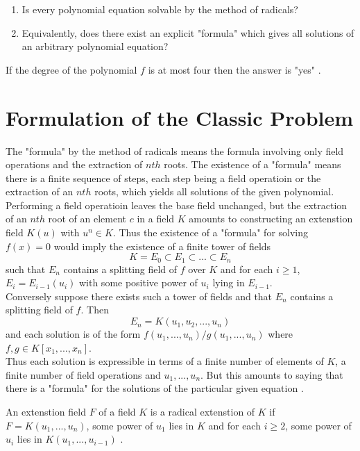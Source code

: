 \begin{enumerate}
\item Is every polynomial equation solvable by the method of radicals?
\item Equivalently, does there exist an explicit "formula" which gives all solutions of an arbitrary polynomial equation?
\end{enumerate}

If the degree of  the polynomial \(f\) is at most four then the answer is "yes" \cite{hunger}.

\section{Formulation of the Classic Problem}
The "formula" by the method of radicals means the formula involving only field operations and the extraction of \(nth\) roots.
The existence of a "formula" means there is a finite sequence of steps, each step being a field operatioin or the extraction of an \(nth\) roots, which yields all solutions of the given polynomial.
Performing a field operatioin leaves the base field unchanged, but the extraction of an \(nth\) root of an element
\(c\) in a field \(K\) amounts to constructing an extenstion field \(K(u)\) with \(u^n \in K\). Thus the existence of a "formula" for solving \(f(x)=0\) would imply
the existence of a finite tower of fields
\[K=E_0 \subset E_1 \subset ... \subset E_n\]
such that \(E_n\) contains a splitting field of \(f\) over \(K\) and for each \(i \geq 1\), \(E_i=E_{i-1}(u_i)\) with some positive power of \(u_i\) lying in \(E_{i-1}\).\\
Conversely suppose there exists such a tower of fields and that \(E_n\) contains a splitting field of \(f\). Then
\[E_n = K(u_1,u_2,...,u_n)\]
and each solution is of the form \(f(u_1,...,u_n)/g(u_1,...,u_n)\) where \(f,g \in K[x_1,...,x_n]\). \\
Thus each solution is expressible in terms of a finite number of elements of \(K\), a finite number of field operations and \(u_1,...,u_n\). But
this amounts to saying that there is a "formula" for the solutions of the particular given equation \cite{hunger}. \\

\begin{definition}
An extenstion field \(F\) of a field \(K\) is a radical extenstion of \(K\) if \(F=K(u_1,...,u_n)\), some power of \(u_1\) lies in \(K\) and for each \(i \geq 2\), some power of \(u_i\) lies in \(K(u_1,...,u_{i-1})\) \cite{hunger}.
\end{definition}

